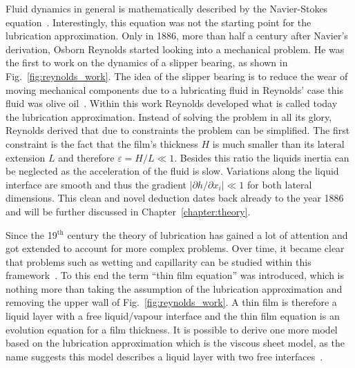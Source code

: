 Fluid dynamics in general is mathematically described by the Navier-Stokes equation~\cite{Navier, Stokes}.
Interestingly, this equation was not the starting point for the lubrication approximation.
Only in 1886, more than half a century after Navier's derivation, Osborn Reynolds started looking into a mechanical problem. 
He was the first to work on the dynamics of a slipper bearing, as shown in Fig.~\ref{fig:reynolds_work}.
The idea of the slipper bearing is to reduce the wear of moving mechanical components due to a lubricating fluid in Reynolds' case this fluid was olive oil~\cite{reynoldsTheoryLubricationIts1886}.
Within this work Reynolds developed what is called today the lubrication approximation.
Instead of solving the problem in all its glory, Reynolds derived that due to constraints the problem can be simplified. 
The first constraint is the fact that the film's thickness $H$ is much smaller than its lateral extension $L$ and therefore $\varepsilon = H/L \ll 1$. 
Besides this ratio the liquids inertia can be neglected as the acceleration of the fluid is slow.
Variations along the liquid interface are smooth and thus the gradient $|\partial h/\partial x_i| \ll 1$ for both lateral dimensions.
This clean and novel deduction dates back already to the year 1886 and will be further discussed in Chapter~\ref{chapter:theory}.

Since the 19$^{\text{th}}$ century the theory of lubrication has gained a lot of attention and got extended to account for more complex problems.
Over time, it became clear that problems such as wetting and capillarity can be studied within this framework~\cite{degennesWettingStaticsDynamics1985, oronLongscaleEvolutionThin1997, crasterDynamicsStabilityThin2009}.
To this end the term ``thin film equation'' was introduced, which is nothing more than taking the assumption of the lubrication approximation and removing the upper wall of Fig.~\ref{fig:reynolds_work}.
A thin film is therefore a liquid layer with a free liquid/vapour interface and the thin film equation is an evolution equation for a film thickness.
It is possible to derive one more model based on the lubrication approximation which is the viscous sheet model, as the name suggests this model describes a liquid layer with two free interfaces~\cite{savvaViscousSheetRetraction2009}.

